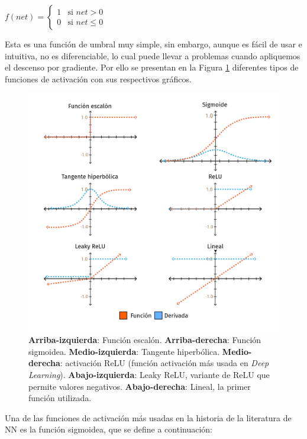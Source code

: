 \documentclass[a4paper,12pt]{article}
\begin{document}
$
f(net) =
\left\{
\begin{array}{ll}
	1 & \mbox{si } net > 0    \\
	0 & \mbox{si } net \leq 0 
\end{array}
\right.
$

Esta es una función de umbral muy simple, sin embargo, aunque es fácil de usar e intuitiva, no es diferenciable, lo cual puede llevar a problemas cuando apliquemos el descenso por gradiente.
Por ello se presentan en la Figura \ref{fig:typesfactivation} diferentes tipos de funciones de activación con sus respectivos gráficos.

\begin{figure}[H]
	\begin{center}				
		\includegraphics[width=1\textwidth]{021.png}
		\caption{\textbf{Arriba-izquierda}: Función escalón. \textbf{Arriba-derecha}: Función sigmoidea. \textbf{Medio-izquierda}: Tangente hiperbólica. \textbf{Medio-derecha}: activación ReLU (función activación más usada en \textit{Deep Learning}).
			\textbf{Abajo-izquierda}: Leaky ReLU, variante de ReLU que permite valores negativos. \textbf{Abajo-derecha}:
		Lineal, la primer función utilizada.}
		\label{fig:typesfactivation}
	\end{center}
\end{figure}

Una de las funciones de activación más usadas en la historia de la literatura de NN es la función sigmoidea, que se define a continuación:
\end{document}
